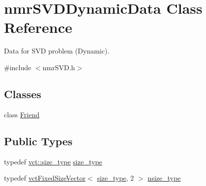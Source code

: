 \hypertarget{classnmr_s_v_d_dynamic_data}{}\section{nmr\+S\+V\+D\+Dynamic\+Data Class Reference}
\label{classnmr_s_v_d_dynamic_data}


Data for S\+V\+D problem (Dynamic).  




{\ttfamily \#include $<$nmr\+S\+V\+D.\+h$>$}

\subsection*{Classes}
\begin{DoxyCompactItemize}
\item 
class \hyperlink{classnmr_s_v_d_dynamic_data_1_1_friend}{Friend}
\end{DoxyCompactItemize}
\subsection*{Public Types}
\begin{DoxyCompactItemize}
\item 
typedef \hyperlink{namespacevct_a3e2935e13aac4500965e00d30565775b}{vct\+::size\+\_\+type} \hyperlink{classnmr_s_v_d_dynamic_data_ae1d183124f1fe39da05af9cea168101d}{size\+\_\+type}
\item 
typedef \hyperlink{classvct_fixed_size_vector}{vct\+Fixed\+Size\+Vector}$<$ \hyperlink{classnmr_s_v_d_dynamic_data_ae1d183124f1fe39da05af9cea168101d}{size\+\_\+type}, 2 $>$ \hyperlink{classnmr_s_v_d_dynamic_data_a3673bb17448a97213388b41ce36ef5b0}{nsize\+\_\+type}
\end{DoxyCompactItemize}
